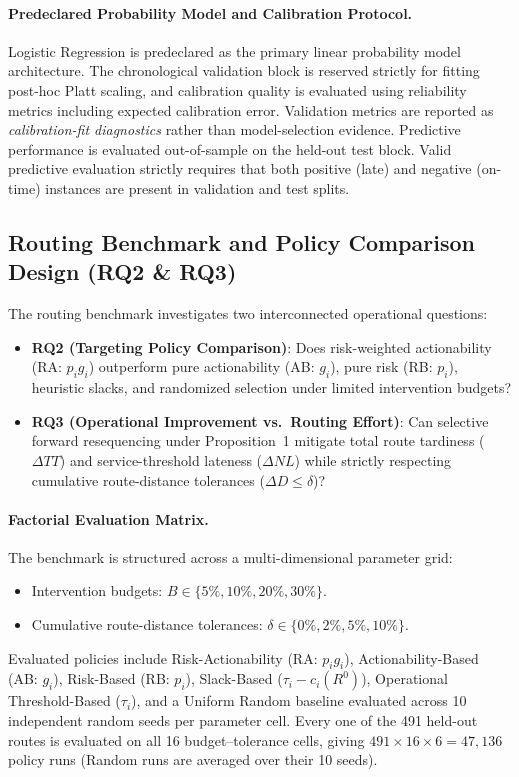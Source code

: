\documentclass[11pt,a4paper]{article}
\begin{document}
\paragraph{Predeclared Probability Model and Calibration Protocol.}
Logistic Regression is predeclared as the primary linear probability model architecture. The chronological validation block is reserved strictly for fitting post-hoc Platt scaling, and calibration quality is evaluated using reliability metrics including expected calibration error. Validation metrics are reported as \emph{calibration-fit diagnostics} rather than model-selection evidence. Predictive performance is evaluated out-of-sample on the held-out test block. Valid predictive evaluation strictly requires that both positive (late) and negative (on-time) instances are present in validation and test splits.

\subsection{Routing Benchmark and Policy Comparison Design (RQ2 \& RQ3)}\label{sec:routing-benchmark-design}
The routing benchmark investigates two interconnected operational questions:
\begin{itemize}
    \item \textbf{RQ2 (Targeting Policy Comparison)}: Does risk-weighted actionability (RA: $p_i g_i$) outperform pure actionability (AB: $g_i$), pure risk (RB: $p_i$), heuristic slacks, and randomized selection under limited intervention budgets?
    \item \textbf{RQ3 (Operational Improvement vs.\ Routing Effort)}: Can selective forward resequencing under Proposition~1 mitigate total route tardiness ($\Delta TT$) and service-threshold lateness ($\Delta NL$) while strictly respecting cumulative route-distance tolerances ($\Delta D \le \delta$)?
\end{itemize}

\paragraph{Factorial Evaluation Matrix.}
The benchmark is structured across a multi-dimensional parameter grid:
\begin{itemize}
    \item Intervention budgets: $B \in \{5\%, 10\%, 20\%, 30\%\}$.
    \item Cumulative route-distance tolerances: $\delta \in \{0\%, 2\%, 5\%, 10\%\}$.
\end{itemize}
Evaluated policies include Risk-Actionability (RA: $p_i g_i$), Actionability-Based (AB: $g_i$), Risk-Based (RB: $p_i$), Slack-Based ($\tau_i - c_i(R^0)$), Operational Threshold-Based ($\tau_i$), and a Uniform Random baseline evaluated across 10 independent random seeds per parameter cell. Every one of the 491 held-out routes is evaluated on all 16 budget--tolerance cells, giving $491 \times 16 \times 6 = 47{,}136$ policy runs (Random runs are averaged over their 10 seeds).
\end{document}
